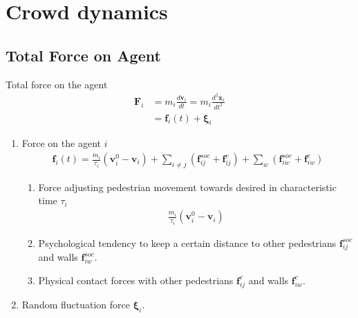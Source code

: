 \section{Crowd dynamics}
\subsection{Total Force on Agent}
Total force on the agent
\begin{align}
\mathbf{F}_{i} &= m_{i} \frac{d\mathbf{v}_{i}}{dt} = m_{i} \frac{d^{2}\mathbf{x}_{i}}{dt^{2}} \\
&= \mathbf{f}_{i}(t) + \boldsymbol{\xi}_{i}
\end{align}


\begin{enumerate}
\item 
Force on the agent $ i $
\begin{align}
\mathbf{f}_{i}(t) = \frac{m_{i}}{\tau_{i}} (\mathbf{v}_{i}^{0} - \mathbf{v}_{i}) + \sum_{i\neq j}^{} \left(\mathbf{f}_{ij}^{soc} + \mathbf{f}_{ij}^{c}\right) + \sum_{w}^{} \left(\mathbf{f}_{iw}^{soc} + \mathbf{f}_{iw}^{c}\right)
\end{align}

\begin{enumerate}
\item 
Force adjusting pedestrian movement towards desired in characteristic time $ \tau_{i} $
\begin{align}
\frac{m_{i}}{\tau_{i}} (\mathbf{v}_{i}^{0} - \mathbf{v}_{i})
\end{align}

\item 
Psychological tendency to keep a certain distance to other pedestrians $ \mathbf{f}_{ij}^{soc} $ and walls $ \mathbf{f}_{iw}^{soc} $.

\item 
Physical contact forces with other pedestrians $ \mathbf{f}_{ij}^{c} $ and walls $ \mathbf{f}_{iw}^{c} $.

\end{enumerate}

\item 
Random fluctuation force $ \boldsymbol{\xi}_{i} $.


\end{enumerate}

